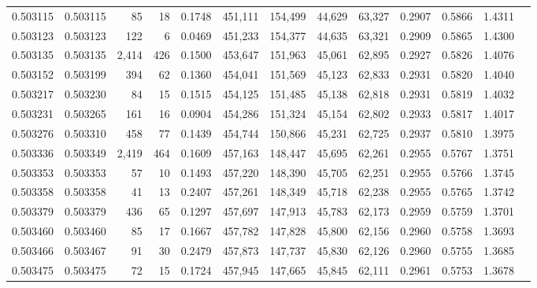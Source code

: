 \begin{tabular}{rrrrrrrrrrrrr}
0.503115 & 0.503115 &    85 &    18 &                                     0.1748 & 451,111 & 154,499 &  44,629 &  63,327 & 0.2907 & 0.5866 & 1.4311 \\
0.503123 & 0.503123 &   122 &     6 &                                     0.0469 & 451,233 & 154,377 &  44,635 &  63,321 & 0.2909 & 0.5865 & 1.4300 \\
0.503135 & 0.503135 & 2,414 &   426 &                                     0.1500 & 453,647 & 151,963 &  45,061 &  62,895 & 0.2927 & 0.5826 & 1.4076 \\
0.503152 & 0.503199 &   394 &    62 &                                     0.1360 & 454,041 & 151,569 &  45,123 &  62,833 & 0.2931 & 0.5820 & 1.4040 \\
0.503217 & 0.503230 &    84 &    15 &                                     0.1515 & 454,125 & 151,485 &  45,138 &  62,818 & 0.2931 & 0.5819 & 1.4032 \\
0.503231 & 0.503265 &   161 &    16 &                                     0.0904 & 454,286 & 151,324 &  45,154 &  62,802 & 0.2933 & 0.5817 & 1.4017 \\
0.503276 & 0.503310 &   458 &    77 &                                     0.1439 & 454,744 & 150,866 &  45,231 &  62,725 & 0.2937 & 0.5810 & 1.3975 \\
0.503336 & 0.503349 & 2,419 &   464 &                                     0.1609 & 457,163 & 148,447 &  45,695 &  62,261 & 0.2955 & 0.5767 & 1.3751 \\
0.503353 & 0.503353 &    57 &    10 &                                     0.1493 & 457,220 & 148,390 &  45,705 &  62,251 & 0.2955 & 0.5766 & 1.3745 \\
0.503358 & 0.503358 &    41 &    13 &                                     0.2407 & 457,261 & 148,349 &  45,718 &  62,238 & 0.2955 & 0.5765 & 1.3742 \\
0.503379 & 0.503379 &   436 &    65 &                                     0.1297 & 457,697 & 147,913 &  45,783 &  62,173 & 0.2959 & 0.5759 & 1.3701 \\
0.503460 & 0.503460 &    85 &    17 &                                     0.1667 & 457,782 & 147,828 &  45,800 &  62,156 & 0.2960 & 0.5758 & 1.3693 \\
0.503466 & 0.503467 &    91 &    30 &                                     0.2479 & 457,873 & 147,737 &  45,830 &  62,126 & 0.2960 & 0.5755 & 1.3685 \\
0.503475 & 0.503475 &    72 &    15 &                                     0.1724 & 457,945 & 147,665 &  45,845 &  62,111 & 0.2961 & 0.5753 & 1.3678 \\

\end{tabular}
